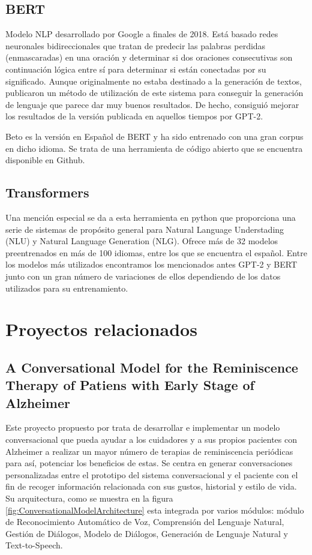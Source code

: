 \subsection{BERT}
Modelo NLP desarrollado por Google a finales de 2018. Está basado redes neuronales bidireccionales que tratan de predecir las palabras perdidas (enmascaradas) en una oración y determinar si dos oraciones consecutivas son continuación lógica entre sí para determinar si están conectadas por su significado. Aunque originalmente no estaba destinado a la generación de textos, \cite{wang-cho-2019-bert} publicaron un método de utilización de este sistema para conseguir la generación de lenguaje que parece dar muy buenos resultados. De hecho, consiguió mejorar los resultados de la versión publicada en aquellos tiempos por GPT-2. 

Beto es la versión en Español de BERT \citep{CaneteCFP2020} y ha sido entrenado con una gran corpus en dicho idioma. Se trata de una herramienta de código abierto que se encuentra disponible en Github.


\subsection{Transformers}
Una mención especial se da a esta herramienta en python que proporciona una serie de sistemas de propósito general para Natural Language Understading (NLU) y Natural Language Generation (NLG). Ofrece más de 32 modelos preentrenados en más de 100 idiomas, entre los que se encuentra el español. Entre los modelos más utilizados encontramos los mencionados antes GPT-2 y BERT junto con un gran número de variaciones de ellos dependiendo de los datos utilizados para su entrenamiento.


\section{Proyectos relacionados}

\subsection{A Conversational Model for the Reminiscence Therapy of Patiens with Early Stage of Alzheimer}
Este proyecto propuesto por \cite{deconversational} trata de desarrollar e implementar un modelo conversacional que pueda ayudar a los cuidadores y a sus propios pacientes con Alzheimer a realizar un mayor número de terapias de reminiscencia periódicas para así, potenciar los beneficios de estas. Se centra en generar conversaciones personalizadas entre el prototipo del sistema conversacional y el paciente con el fin de recoger información relacionada con sus gustos, historial y estilo de vida. Su arquitectura, como se muestra en la figura \ref{fig:ConversationalModelArchitecture} esta integrada por varios módulos: módulo de Reconocimiento Automático de Voz, Comprensión del Lenguaje Natural, Gestión de Diálogos, Modelo de Diálogos, Generación de Lenguaje Natural y Text-to-Speech.



